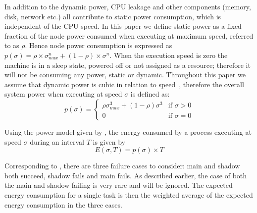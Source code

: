 In addition to the dynamic power, CPU leakage and other components
(memory, disk, network etc.) all contribute to static power
consumption, which is independent of the CPU speed. In this paper we
define static power as a fixed fraction of the node power consumed
when executing at maximum speed, referred to as $\rho$. Hence node
power consumption is expressed as
$p(\sigma)=\rho \times \sigma_{max}^n + (1-\rho)\times \sigma^n$. When the execution speed is zero
the machine is in a sleep state, powered off or not assigned as a
resource; therefore it will not be consuming any power, static or
dynamic.  Throughout this paper we assume that dynamic power is cubic
in relation to
speed~\cite{rusu_2003_ecs,zhai_2004_dac}, therefore the
overall system power when executing at speed $\sigma$ is defined as:
\begin{equation}
p(\sigma) = \begin{cases} \rho \sigma_{max}^3 + (1-\rho) \sigma^3 & \mbox{if } \sigma > 0 \\ 
                          0 & \mbox{if } \sigma = 0 \end{cases}
\label{eq:power_model}
\end{equation}

Using the power model given by , the
energy consumed by a process executing at speed $\sigma$ during an
interval $T$ is given by
\begin{equation}
E(\sigma,T) = p(\sigma) \times T
\end{equation}


Corresponding to , there are three
failure cases to consider: main and shadow both succeed, shadow fails
and main fails. As described earlier, the case of both the main and
shadow failing is very rare and will be ignored. The expected
energy consumption for a single task is then the weighted average of
the expected energy consumption in the three cases.


